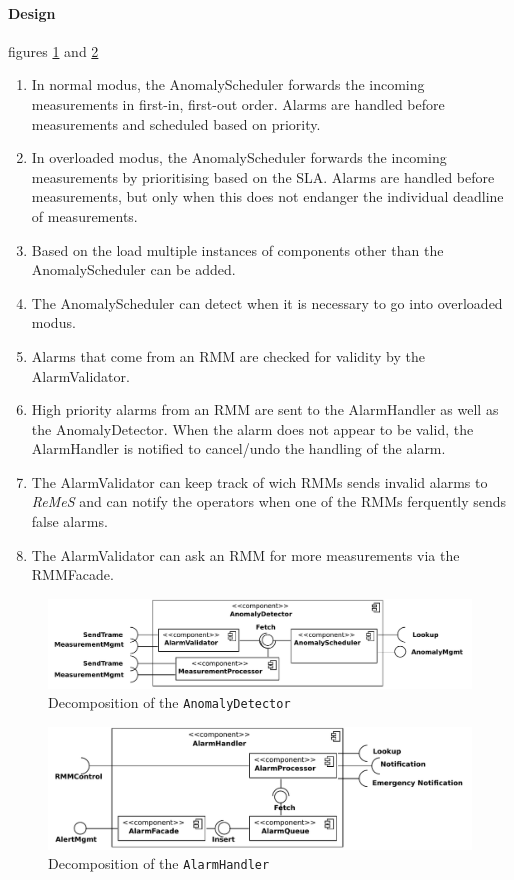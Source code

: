 \documentclass[a4paper,10pt]{article}
\newcommand{\rem}{\emph{ReMeS}\xspace}
\begin{document}
\paragraph{Design} figures \ref{fig:dec_anomaly} and \ref{fig:dec_alarmhandler}

\begin{enumerate}
    \item In normal modus, the AnomalyScheduler forwards the incoming measurements in first-in, first-out order. Alarms are handled before measurements and scheduled based on priority.
    \item In overloaded modus, the AnomalyScheduler forwards the incoming measurements by prioritising based on the SLA. Alarms are handled before measurements, but only when this does not endanger the individual deadline of measurements.
    \item Based on the load multiple instances of components other than the AnomalyScheduler can be added.
    \item The AnomalyScheduler can detect when it is necessary to go into overloaded modus.
    \item Alarms that come from an RMM are checked for validity by the AlarmValidator.
    \item High priority alarms from an RMM are sent to the AlarmHandler as well as the AnomalyDetector. When the alarm does not appear to be valid, the AlarmHandler is notified to cancel/undo the handling of the alarm.
    \item The AlarmValidator can keep track of wich RMMs sends invalid alarms to \rem and can notify the operators when one of the RMMs ferquently sends false alarms.
   	\item The AlarmValidator can ask an RMM for more measurements via the RMMFacade.
\end{enumerate}

\begin{figure}[!htp]
    \centering
    \includegraphics[width=\textwidth]{Decomposition__AnomalyDetector}
    \caption{Decomposition of the \texttt{AnomalyDetector}}\label{fig:dec_anomaly}
\end{figure}

\begin{figure}[!htp]
    \centering
    \includegraphics[width=\textwidth]{Decomposition__AlarmHandler_component}
    \caption{Decomposition of the \texttt{AlarmHandler}}\label{fig:dec_alarmhandler}
\end{figure}
\end{document}
